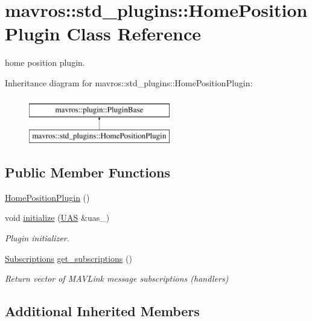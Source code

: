 \hypertarget{classmavros_1_1std__plugins_1_1HomePositionPlugin}{}\section{mavros\+::std\+\_\+plugins\+::Home\+Position\+Plugin Class Reference}
\label{classmavros_1_1std__plugins_1_1HomePositionPlugin}


home position plugin.  


Inheritance diagram for mavros\+::std\+\_\+plugins\+::Home\+Position\+Plugin\+:\begin{figure}[H]
\begin{center}
\leavevmode
\includegraphics[height=2.000000cm]{classmavros_1_1std__plugins_1_1HomePositionPlugin}
\end{center}
\end{figure}
\subsection*{Public Member Functions}
\begin{DoxyCompactItemize}
\item 
\mbox{\hyperlink{group__plugin_gabfbef02bbcde71f9210b3289ace49100}{Home\+Position\+Plugin}} ()
\item 
void \mbox{\hyperlink{group__plugin_ga79d40eaf420dfce7a44db82cc6b46331}{initialize}} (\mbox{\hyperlink{classmavros_1_1UAS}{U\+AS}} \&uas\+\_\+)
\begin{DoxyCompactList}\small\item\em Plugin initializer. \end{DoxyCompactList}\item 
\mbox{\hyperlink{group__plugin_ga8967d61fc77040e0c3ea5a4585d62a09}{Subscriptions}} \mbox{\hyperlink{group__plugin_ga09ac4c0f6994b81c5e7f5b072f71e7d2}{get\+\_\+subscriptions}} ()
\begin{DoxyCompactList}\small\item\em Return vector of M\+A\+V\+Link message subscriptions (handlers) \end{DoxyCompactList}\end{DoxyCompactItemize}
\subsection*{Additional Inherited Members}


